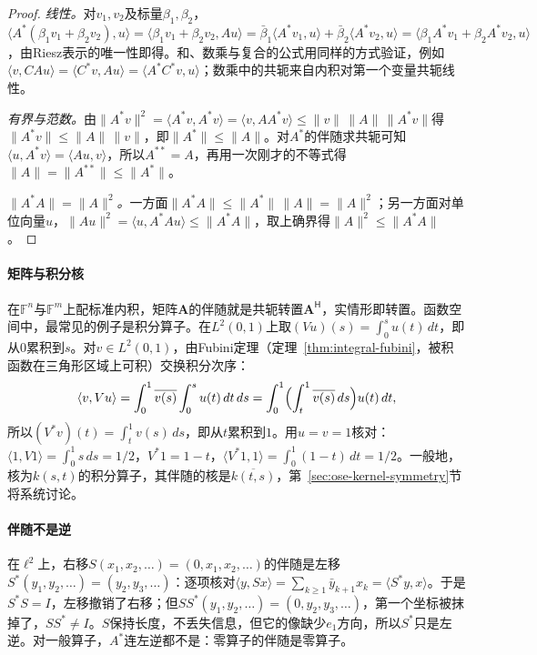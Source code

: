 \begin{proof}
\emph{线性。}对$v_1,v_2$及标量$\beta_1,\beta_2$，$\langle A^*(\beta_1v_1+\beta_2v_2),u\rangle=\langle\beta_1v_1+\beta_2v_2,Au\rangle=\bar\beta_1\langle A^*v_1,u\rangle+\bar\beta_2\langle A^*v_2,u\rangle=\langle\beta_1A^*v_1+\beta_2A^*v_2,u\rangle$，由Riesz表示的唯一性即得。和、数乘与复合的公式用同样的方式验证，例如$\langle v,CAu\rangle=\langle C^*v,Au\rangle=\langle A^*C^*v,u\rangle$；数乘中的共轭来自内积对第一个变量共轭线性。

\emph{有界与范数。}由$\|A^*v\|^2=\langle A^*v,A^*v\rangle=\langle v,AA^*v\rangle\leq\|v\|\,\|A\|\,\|A^*v\|$得$\|A^*v\|\leq\|A\|\,\|v\|$，即$\|A^*\|\leq\|A\|$。对$A^*$的伴随求共轭可知$\langle u,A^*v\rangle=\langle Au,v\rangle$，所以$A^{**}=A$，再用一次刚才的不等式得$\|A\|=\|A^{**}\|\leq\|A^*\|$。

\emph{$\|A^*A\|=\|A\|^2$。}一方面$\|A^*A\|\leq\|A^*\|\,\|A\|=\|A\|^2$；另一方面对单位向量$u$，$\|Au\|^2=\langle u,A^*Au\rangle\leq\|A^*A\|$，取上确界得$\|A\|^2\leq\|A^*A\|$。
\end{proof}

\paragraph{矩阵与积分核}
在$\mathbb F^n$与$\mathbb F^m$上配标准内积，矩阵$\bm A$的伴随就是共轭转置$\bm A^{\mathsf H}$，实情形即转置。函数空间中，最常见的例子是积分算子。在$L^2(0,1)$上取$(Vu)(s)=\int_0^su(t)\,dt$，即从$0$累积到$s$。对$v\in L^2(0,1)$，由Fubini定理（定理~\ref{thm:integral-fubini}，被积函数在三角形区域上可积）交换积分次序：
\[
 \langle v,Vu\rangle=\int_0^1\overline{v(s)}\int_0^su(t)\,dt\,ds=\int_0^1\Bigl(\int_t^1\overline{v(s)}\,ds\Bigr)u(t)\,dt ,
\]
所以$(V^*v)(t)=\int_t^1v(s)\,ds$，即从$t$累积到$1$。用$u=v=1$核对：$\langle1,V1\rangle=\int_0^1s\,ds=1/2$，$V^*1=1-t$，$\langle V^*1,1\rangle=\int_0^1(1-t)\,dt=1/2$。一般地，核为$k(s,t)$的积分算子，其伴随的核是$\overline{k(t,s)}$，第~\ref{sec:ose-kernel-symmetry}节将系统讨论。

\paragraph{伴随不是逆}
在$\ell^2$上，右移$S(x_1,x_2,\ldots)=(0,x_1,x_2,\ldots)$的伴随是左移$S^*(y_1,y_2,\ldots)=(y_2,y_3,\ldots)$：逐项核对$\langle y,Sx\rangle=\sum_{k\geq1}\bar y_{k+1}x_k=\langle S^*y,x\rangle$。于是$S^*S=I$，左移撤销了右移；但$SS^*(y_1,y_2,\ldots)=(0,y_2,y_3,\ldots)$，第一个坐标被抹掉了，$SS^*\neq I$。$S$保持长度，不丢失信息，但它的像缺少$e_1$方向，所以$S^*$只是左逆。对一般算子，$A^*$连左逆都不是：零算子的伴随是零算子。

